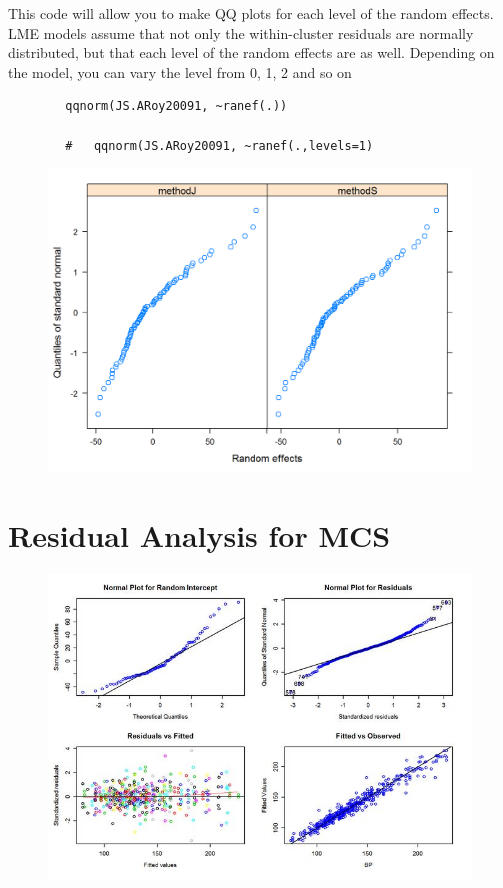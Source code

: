 \documentclass[12pt, a4paper]{report}
\theoremstyle{plain}
\theoremstyle{definition}
\theoremstyle{remark}
\begin{document}
	This code will allow you to make QQ plots for each level of the random effects.  LME models assume that not only the within-cluster residuals are normally distributed, but that each level of the random effects are as well. Depending on the model, you can vary the level from 0, 1, 2 and so on
	\begin{framed}
		\begin{verbatim}
		qqnorm(JS.ARoy20091, ~ranef(.))
		
		# 	qqnorm(JS.ARoy20091, ~ranef(.,levels=1)
		\end{verbatim}
	\end{framed}
	\begin{figure}[h!]
		\centering
		\includegraphics[width=0.9\linewidth]{images/ResidPlot2}
		\caption{}
		\label{fig:ResidPlot2}
	\end{figure}	
	
	
	



		
	
		




\newpage
\section{Residual Analysis for MCS}

\begin{figure}[h!]
	\centering
	\includegraphics[width=0.9\linewidth]{images/ResidPlot}
	\caption{}
	\label{fig:ResidPlot}
\end{figure}
\end{document}
